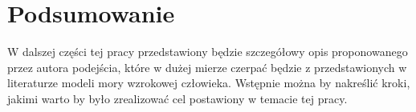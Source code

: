 









%


%





\section{Podsumowanie}
\label{Chapter1_sumUp}

W dalszej części tej pracy przedstawiony będzie szczegółowy opis proponowanego przez autora podejścia, które w dużej mierze czerpać będzie z przedstawionych w literaturze modeli mory wzrokowej człowieka. Wstępnie można by nakreślić kroki, jakimi warto by było zrealizować cel postawiony w temacie tej pracy. 

